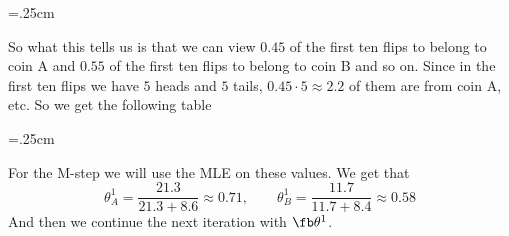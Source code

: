     \centerline{\vbox{\tabskip=.25cm}}

    So what this tells us is that we can view $0.45$ of the first ten flips to belong to coin A and $0.55$ of the first ten flips to belong to coin B and so on.
    Since in the first ten flips we have $5$ heads and $5$ tails, $0.45\cdot5\approx2.2$ of them are from coin A, etc.
    So we get the following table

    \centerline{\vbox{\tabskip=.25cm}}

    For the M-step we will use the MLE on these values.
    We get that
    $$ \theta_A^1 = \frac{21.3}{21.3 + 8.6} \approx 0.71,\qquad \theta_B^1 = \frac{11.7}{11.7 + 8.4} \approx 0.58 $$
    And then we continue the next iteration with $\fb\theta^1$.

\eexam

